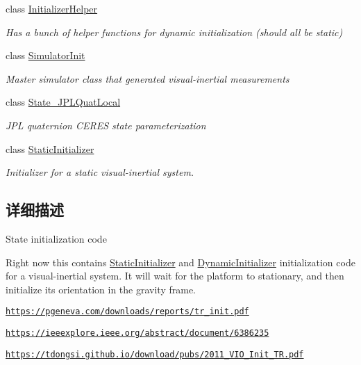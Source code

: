 \begin{DoxyCompactItemize}
class \hyperlink{classov__init_1_1InitializerHelper}{Initializer\+Helper}
\begin{DoxyCompactList}\small\item\em Has a bunch of helper functions for dynamic initialization (should all be static) \end{DoxyCompactList}\item 
class \hyperlink{classov__init_1_1SimulatorInit}{Simulator\+Init}
\begin{DoxyCompactList}\small\item\em Master simulator class that generated visual-\/inertial measurements \end{DoxyCompactList}\item 
class \hyperlink{classov__init_1_1State__JPLQuatLocal}{State\+\_\+\+J\+P\+L\+Quat\+Local}
\begin{DoxyCompactList}\small\item\em J\+PL quaternion C\+E\+R\+ES state parameterization \end{DoxyCompactList}\item 
class \hyperlink{classov__init_1_1StaticInitializer}{Static\+Initializer}
\begin{DoxyCompactList}\small\item\em Initializer for a static visual-\/inertial system. \end{DoxyCompactList}\end{DoxyCompactItemize}


\subsection{详细描述}
State initialization code 

Right now this contains \hyperlink{classov__init_1_1StaticInitializer}{Static\+Initializer} and \hyperlink{classov__init_1_1DynamicInitializer}{Dynamic\+Initializer} initialization code for a visual-\/inertial system. It will wait for the platform to stationary, and then initialize its orientation in the gravity frame.


\begin{DoxyItemize}
\item \href{https://pgeneva.com/downloads/reports/tr_init.pdf}{\tt https\+://pgeneva.\+com/downloads/reports/tr\+\_\+init.\+pdf}
\item \href{https://ieeexplore.ieee.org/abstract/document/6386235}{\tt https\+://ieeexplore.\+ieee.\+org/abstract/document/6386235}
\item \href{https://tdongsi.github.io/download/pubs/2011_VIO_Init_TR.pdf}{\tt https\+://tdongsi.\+github.\+io/download/pubs/2011\+\_\+\+V\+I\+O\+\_\+\+Init\+\_\+\+T\+R.\+pdf}
\end{DoxyItemize}

